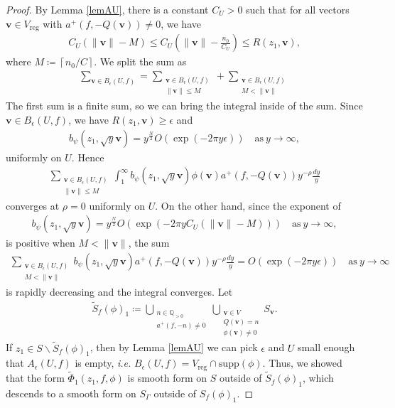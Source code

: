 \documentclass[twoside,a4paper,10pt]{article} %
\newcommand{\8}{\infty}
\newcommand{\vbf}{\mathbf{v}}
\newcommand{\Stil}{\widetilde{S}}
\newcommand{\Q}{\mathbb{Q}}
\newcommand{\reg}{\mathrm{reg}}
\newcommand{\supp}{\mathrm{supp}}
\theoremstyle{mytheoremstyle}
\theoremstyle{remark}
\numberwithin{equation}{section}
\begin{document}
\begin{proof}
By Lemma \ref{lemAU}, there is a constant $C_U>0$ such that for all vectors $\vbf \in V_{\reg}$ with $a^+(f,-Q(\vbf)) \neq 0$, we have
\begin{align}
C_U \left (  \lVert \vbf \rVert-M \right ) \leq C_U \left (  \lVert \vbf \rVert-\frac{n_0}{C_U} \right ) \leq  R(z_1, \vbf),
\end{align}
where $M \coloneqq \left \lceil{n_0/C}\right \rceil $. We split the sum as 
\begin{align}
\sum_{\vbf \in B_\epsilon(U,f)}=\sum_{\substack{\vbf \in B_\epsilon(U,f) \\ \lVert \vbf \rVert \leq M   }}+\sum_{\substack{\vbf \in B_\epsilon(U,f) \\ M < \lVert \vbf \rVert}} 
\end{align}
The first sum is a finite sum, so we can bring the integral inside of the sum. Since $\vbf \in B_\epsilon(U,f)$,  we have $R(z_1,\vbf) \geq \epsilon$ and
\begin{align}
b_\psi(z_1,\sqrt{y}\vbf) =  y^\frac{N}{2} O( \exp \left (-2\pi y \epsilon \right )) \quad \textrm{as} \ y\rightarrow \8,
\end{align}
uniformly on $U$. Hence
\begin{align}
 \sum_{\substack{\vbf \in B_\epsilon(U,f) \\ \lVert \vbf \rVert \leq M}} \int_1^\8 b_\psi(z_1,\sqrt{y}\vbf)\phi(\vbf)a^+(f,-Q(\vbf))y^{-\rho} \frac{dy}{y}
\end{align}
converges at $\rho=0$ uniformly on $U$. On the other hand, since the exponent of
\begin{align}
b_\psi(z_1,\sqrt{y}\vbf) =  y^\frac{N}{2} O( \exp \left (-2\pi y C_U \left (  \lVert \vbf \rVert-M \right ) \right )) \quad \textrm{as} \ y\rightarrow \8,
\end{align}
is positive when $M <\lVert \vbf \rVert$, the sum
\begin{align}
\sum_{\substack{\vbf \in B_\epsilon(U,f) \\ M< \lVert \vbf \rVert }}  b_\psi(z_1,\sqrt{y}\vbf)a^+(f,-Q(\vbf))y^{-\rho} \frac{dy}{y}= O( \exp \left (-2\pi y \epsilon \right )) \quad \textrm{as} \ y\rightarrow \8
\end{align}
is rapidly decreasing and the integral converges. Let 
\begin{align}
\Stil_f(\phi)_1 \coloneqq \bigcup_{\substack{ n \in \Q_{>0} \\ a^+(f,-n) \neq 0}} \bigcup_{\substack{ \vbf \in  V \\ Q(\vbf)=n \\ \phi (\vbf) \neq 0}} S_{\vbf}.
\end{align} If $z_1 \in S \smallsetminus \Stil_f(\phi)_1$, then by Lemma \ref{lemAU} we can pick $\epsilon$ and $U$ small enough that $A_\epsilon(U,f)$ is empty, {\em i.e.} $ B_\epsilon(U,f)=V_\reg \cap \supp(\phi)$. Thus, we showed that the form $\widetilde{\Phi}_1(z_1,f,\phi)$ is smooth form on $S$ outside of $\Stil_f(\phi)_1$, which descends to a smooth form on $S_\Gamma$ outside of $S_f(\phi)_1$.


\end{proof}
\end{document}
